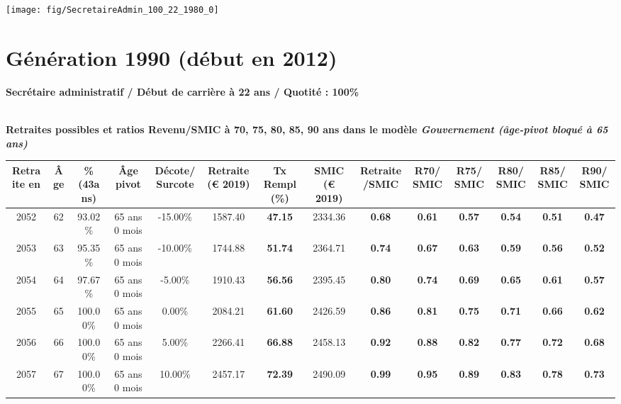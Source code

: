  {\hspace{-2.2cm}\texttt{[image: fig/SecretaireAdmin\_100\_22\_1980\_0]}} 

\newpage 
 
\section{Génération 1990 (début en 2012)\label{SecretaireAdmin_100_22_1990_0}} 
 
{\bf \noindent Secrétaire administratif / Début de carrière à 22 ans / Quotité : 100\%}  ~ 

 ~\\{\bf \noindent Retraites possibles et ratios Revenu/SMIC à 70, 75, 80, 85, 90 ans dans le modèle \emph{Gouvernement (âge-pivot bloqué à 65 ans)}}  
 
\begin{adjustbox}{max width=\textwidth} 
\begin{tabular}[htb]{|c|c||c|c|c||c|c||c|c||c|c|c|c|c|} 
\hline 
 Retraite en &  Âge &  \%(43ans) &  Âge pivot &  Décote/Surcote &  Retraite (\euro{} 2019) &  Tx Rempl(\%) &  SMIC (\euro{} 2019) &  Retraite/SMIC &  R70/SMIC &  R75/SMIC &  R80/SMIC &  R85/SMIC &  R90/SMIC \\ 
\hline \hline 
 2052 &  62 &  93.02\% &  65 ans 0 mois &  -15.00\% &  1587.40 &  {\bf 47.15} &  2334.36 &  {\bf {\color{red} 0.68}} &  {\bf {\color{red} 0.61}} &  {\bf {\color{red} 0.57}} &  {\bf {\color{red} 0.54}} &  {\bf {\color{red} 0.51}} &  {\bf {\color{red} 0.47}} \\ 
\hline 
 2053 &  63 &  95.35\% &  65 ans 0 mois &  -10.00\% &  1744.88 &  {\bf 51.74} &  2364.71 &  {\bf {\color{red} 0.74}} &  {\bf {\color{red} 0.67}} &  {\bf {\color{red} 0.63}} &  {\bf {\color{red} 0.59}} &  {\bf {\color{red} 0.56}} &  {\bf {\color{red} 0.52}} \\ 
\hline 
 2054 &  64 &  97.67\% &  65 ans 0 mois &  -5.00\% &  1910.43 &  {\bf 56.56} &  2395.45 &  {\bf {\color{red} 0.80}} &  {\bf {\color{red} 0.74}} &  {\bf {\color{red} 0.69}} &  {\bf {\color{red} 0.65}} &  {\bf {\color{red} 0.61}} &  {\bf {\color{red} 0.57}} \\ 
\hline 
 2055 &  65 &  100.00\% &  65 ans 0 mois &  0.00\% &  2084.21 &  {\bf 61.60} &  2426.59 &  {\bf {\color{red} 0.86}} &  {\bf {\color{red} 0.81}} &  {\bf {\color{red} 0.75}} &  {\bf {\color{red} 0.71}} &  {\bf {\color{red} 0.66}} &  {\bf {\color{red} 0.62}} \\ 
\hline 
 2056 &  66 &  100.00\% &  65 ans 0 mois &  5.00\% &  2266.41 &  {\bf 66.88} &  2458.13 &  {\bf {\color{red} 0.92}} &  {\bf {\color{red} 0.88}} &  {\bf {\color{red} 0.82}} &  {\bf {\color{red} 0.77}} &  {\bf {\color{red} 0.72}} &  {\bf {\color{red} 0.68}} \\ 
\hline 
 2057 &  67 &  100.00\% &  65 ans 0 mois &  10.00\% &  2457.17 &  {\bf 72.39} &  2490.09 &  {\bf {\color{red} 0.99}} &  {\bf {\color{red} 0.95}} &  {\bf {\color{red} 0.89}} &  {\bf {\color{red} 0.83}} &  {\bf {\color{red} 0.78}} &  {\bf {\color{red} 0.73}} \\ 
\hline 
\hline 
\end{tabular} 
\end{adjustbox} 
 
